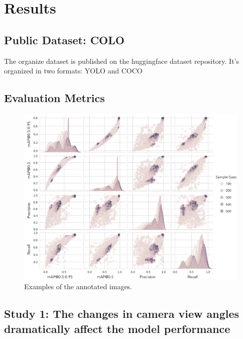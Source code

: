 \section{Results}

\subsection*{Public Dataset: COLO}

The organize dataset is published on the huggingface dataset repository. It's organized in two formats: YOLO and COCO

\subsection*{Evaluation Metrics}


\begin{figure}[H]
    \centering
    \includegraphics[width=1\textwidth]{figure_s1.jpg}
    \caption{Examples of the annotated images.}
    \label{fig:metrics}
\end{figure}



\subsection*{Study 1: The changes in camera view angles dramatically affect the model performance}


